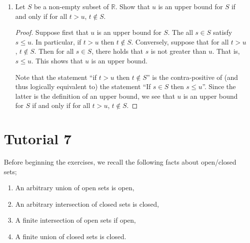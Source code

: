 \documentclass[12pt, reqno]{article}
\numberwithin{equation}{section}
\theoremstyle{definition}
\theoremstyle{remark}
\newcommand{\RR}{\mathbb{R}}
\begin{document}
\begin{enumerate}[leftmargin=*]
	\item Let $S$ be a non-empty subset of $\RR$. Show that $u$ is an upper bound for $S$ if and only if for all $t>u$, $t\not\in S$.

	      \begin{proof}
		      Suppose first that $u$ is an upper bound for $S$. The all $s\in S$ satisfy $s\leq u$. In particular, if $t>u$ then $t\not\in S$. Conversely, suppose that for all $t>u$, $t\not\in S$. Then for all $s\in S$, there holds that $s$ is not greater than $u$. That is, $s\leq u$. This shows that $u$ is an upper bound.

		      Note that the statement ``if $t>u$ then $t\not\in S$'' is the contra-positive of (and thus logically equivalent to) the statement ``If $s\in S$ then $s\leq u$''. Since the latter is the definition of an upper bound, we see that  $u$ is an upper bound for $S$ if and only if for all $t>u$, $t\not\in S$.
	      \end{proof}

\end{enumerate}

\section*{Tutorial 7}

Before beginning the exercises, we recall the following facts about open/closed sets;
\begin{enumerate}[label=(\alph*)]
	\item An arbitrary union of open sets is open,
	\item An arbitrary intersection of closed sets is closed,
	\item A finite intersection of open sets if open,
	\item A finite union of closed sets is closed.
\end{enumerate}
\end{document}
